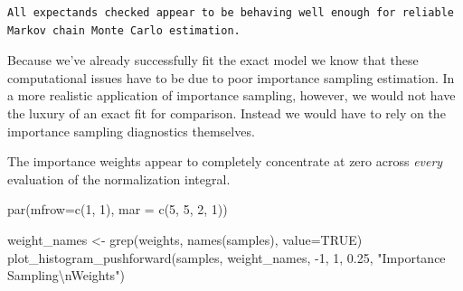 \documentclass[
  letterpaper,
  DIV=11,
  numbers=noendperiod]{scrartcl}
\newenvironment{Shaded}{\begin{snugshade}}{\end{snugshade}}
\newcommand{\AttributeTok}[1]{\textcolor[rgb]{0.40,0.45,0.13}{#1}}
\newcommand{\ConstantTok}[1]{\textcolor[rgb]{0.56,0.35,0.01}{#1}}
\newcommand{\DecValTok}[1]{\textcolor[rgb]{0.68,0.00,0.00}{#1}}
\newcommand{\FloatTok}[1]{\textcolor[rgb]{0.68,0.00,0.00}{#1}}
\newcommand{\FunctionTok}[1]{\textcolor[rgb]{0.28,0.35,0.67}{#1}}
\newcommand{\NormalTok}[1]{\textcolor[rgb]{0.00,0.23,0.31}{#1}}
\newcommand{\OtherTok}[1]{\textcolor[rgb]{0.00,0.23,0.31}{#1}}
\newcommand{\SpecialCharTok}[1]{\textcolor[rgb]{0.37,0.37,0.37}{#1}}
\newcommand{\StringTok}[1]{\textcolor[rgb]{0.13,0.47,0.30}{#1}}
\begin{document}
\begin{Shaded}
\end{Shaded}

\begin{verbatim}
All expectands checked appear to be behaving well enough for reliable
Markov chain Monte Carlo estimation.
\end{verbatim}

Because we've already successfully fit the exact model we know that
these computational issues have to be due to poor importance sampling
estimation. In a more realistic application of importance sampling,
however, we would not have the luxury of an exact fit for comparison.
Instead we would have to rely on the importance sampling diagnostics
themselves.

The importance weights appear to completely concentrate at zero across
\emph{every} evaluation of the normalization integral.

\begin{Shaded}
\begin{Highlighting}[]
\FunctionTok{par}\NormalTok{(}\AttributeTok{mfrow=}\FunctionTok{c}\NormalTok{(}\DecValTok{1}\NormalTok{, }\DecValTok{1}\NormalTok{), }\AttributeTok{mar =} \FunctionTok{c}\NormalTok{(}\DecValTok{5}\NormalTok{, }\DecValTok{5}\NormalTok{, }\DecValTok{2}\NormalTok{, }\DecValTok{1}\NormalTok{))}

\NormalTok{weight\_names }\OtherTok{\textless{}{-}} \FunctionTok{grep}\NormalTok{(}\StringTok{\textquotesingle{}weights\textquotesingle{}}\NormalTok{, }\FunctionTok{names}\NormalTok{(samples), }\AttributeTok{value=}\ConstantTok{TRUE}\NormalTok{)}
\FunctionTok{plot\_histogram\_pushforward}\NormalTok{(samples, weight\_names, }\SpecialCharTok{{-}}\DecValTok{1}\NormalTok{, }\DecValTok{1}\NormalTok{, }\FloatTok{0.25}\NormalTok{,}
                           \StringTok{"Importance Sampling}\SpecialCharTok{\textbackslash{}n}\StringTok{Weights"}\NormalTok{)}
\end{Highlighting}
\end{Shaded}
\end{document}
